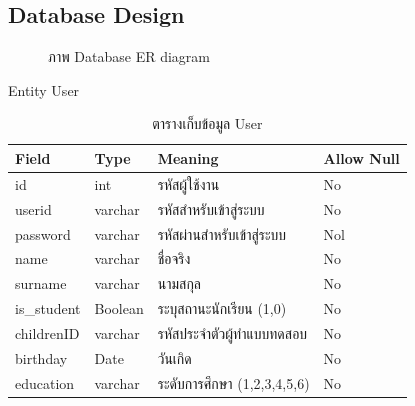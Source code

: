 \documentclass[12pt,oneside,openright,a4paper]{cpe-thai-project}
\begin{document}
\begin{landscape}
\section{Database Design}
\begin{figure}[!ht]\centering
    \setlength{\fboxrule}{0.2mm} %
    \setlength{\fboxsep}{1cm}
    \caption{ภาพ Database ER diagram}\label{fig:database}
   \end{figure}
  \end{landscape}

  Entity User
  \begin{table}[!h]\centering
    \caption{ตารางเก็บข้อมูล User}\label{tbl:application1}
    \begin{tabular}{|p{2cm}|p{2cm}|p{7cm}|p{2cm}|} \hline
      Field & Type & Meaning & Allow Null \\ \hline
      id & int & รหัสผู้ใช้งาน & No \\ \hline
      userid & varchar & รหัสสำหรับเข้าสู่ระบบ &No \\ \hline
      password & varchar & รหัสผ่านสำหรับเข้าสู่ระบบ & Nol \\ \hline
      name & varchar & ชื่อจริง & No \\ \hline
      surname & varchar & นามสกุล & No \\ \hline
      is_student & Boolean & ระบุสถานะนักเรียน (1,0) & No \\ \hline
      childrenID & varchar & รหัสประจำตัวผู้ทำแบบทดสอบ & No \\ \hline
      birthday & Date & วันเกิด & No \\ \hline
      education & varchar & ระดับการศึกษา (1,2,3,4,5,6) & No \\ \hline
    \end{tabular}
    \end{table}
\end{document}
